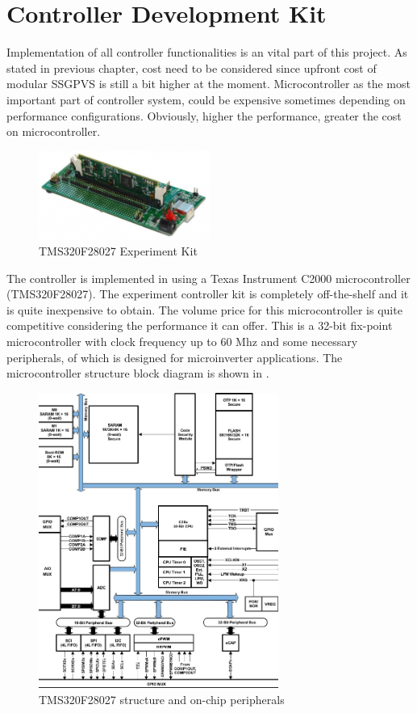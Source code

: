 \section{Controller Development Kit}
Implementation of all controller functionalities is an vital part of this project. As stated in previous chapter, cost need to be considered since upfront cost of modular \gls{SSGPVS} is still a bit higher at the moment. Microcontroller as the most important part of controller system, could be expensive sometimes depending on performance configurations. Obviously, higher the performance, greater the cost on microcontroller. 
\begin{figure}[h]
     \centering
     \includegraphics[width = 0.5\textwidth]{figures/control_card}
     \caption{TMS320F28027 Experiment Kit}
     \label{fig:TMS320F28027}
\end{figure}
The controller is implemented in using a Texas Instrument C2000 microcontroller (TMS320F28027). The experiment controller kit is completely off-the-shelf and it is quite inexpensive to obtain. The volume price for this microcontroller is quite competitive considering the performance it can offer. This is a 32-bit fix-point microcontroller with clock frequency up to 60 Mhz and some necessary peripherals, of which is designed for microinverter applications. The microcontroller structure block diagram is shown in .
\begin{figure}[h]
     \centering
     \includegraphics[width = 0.7\textwidth]{figures/tms320}
     \caption{TMS320F28027 structure and on-chip peripherals}
     \label{fig:tms320}
\end{figure}







